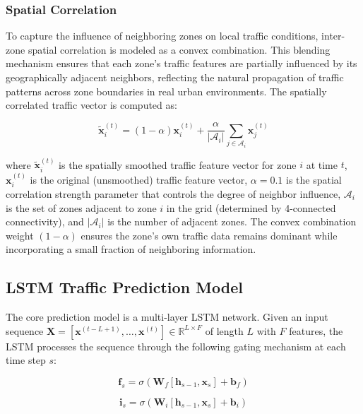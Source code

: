 \documentclass[journal]{IEEEtran}
\begin{document}
\subsubsection{Spatial Correlation}
To capture the influence of neighboring zones on local traffic conditions, inter-zone spatial correlation is modeled as a convex combination. This blending mechanism ensures that each zone's traffic features are partially influenced by its geographically adjacent neighbors, reflecting the natural propagation of traffic patterns across zone boundaries in real urban environments. The spatially correlated traffic vector is computed as:

\begin{equation}
\tilde{\mathbf{x}}_i^{(t)} = (1 - \alpha) \mathbf{x}_i^{(t)} + \frac{\alpha}{|\mathcal{A}_i|} \sum_{j \in \mathcal{A}_i} \mathbf{x}_j^{(t)}
\label{eq:spatial_corr}
\end{equation}

\noindent where $\tilde{\mathbf{x}}_i^{(t)}$ is the spatially smoothed traffic feature vector for zone $i$ at time $t$, $\mathbf{x}_i^{(t)}$ is the original (unsmoothed) traffic feature vector, $\alpha = 0.1$ is the spatial correlation strength parameter that controls the degree of neighbor influence, $\mathcal{A}_i$ is the set of zones adjacent to zone $i$ in the grid (determined by 4-connected connectivity), and $|\mathcal{A}_i|$ is the number of adjacent zones. The convex combination weight $(1 - \alpha)$ ensures the zone's own traffic data remains dominant while incorporating a small fraction of neighboring information.

\subsection{LSTM Traffic Prediction Model}

The core prediction model is a multi-layer LSTM network. Given an input sequence $\mathbf{X} = [\mathbf{x}^{(t-L+1)}, \ldots, \mathbf{x}^{(t)}] \in \mathbb{R}^{L \times F}$ of length $L$ with $F$ features, the LSTM processes the sequence through the following gating mechanism at each time step $s$:

\begin{equation}
\mathbf{f}_s = \sigma(\mathbf{W}_f [\mathbf{h}_{s-1}, \mathbf{x}_s] + \mathbf{b}_f)
\label{eq:forget_gate}
\end{equation}

\begin{equation}
\mathbf{i}_s = \sigma(\mathbf{W}_i [\mathbf{h}_{s-1}, \mathbf{x}_s] + \mathbf{b}_i)
\label{eq:input_gate}
\end{equation}
\end{document}
